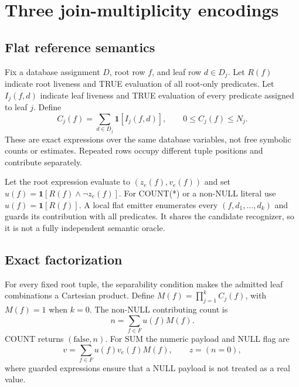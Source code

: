 \documentclass[3p,times,authoryear]{elsarticle}
\newcommand{\ind}[1]{\mathbf{1}[#1]}
\begin{document}
\section{Three join-multiplicity encodings}\label{sec:method}
\subsection{Flat reference semantics}
Fix a database assignment $D$, root row $f$, and leaf row $d\in D_j$. Let $R(f)$ indicate root liveness and TRUE evaluation of all root-only predicates. Let $I_j(f,d)$ indicate leaf liveness and TRUE evaluation of every predicate assigned to leaf $j$. Define
\begin{equation}
 C_j(f)=\sum_{d\in D_j}\ind{I_j(f,d)},\qquad 0\le C_j(f)\le N_j.
 \label{eq:counts}
\end{equation}
These are exact expressions over the same database variables, not free symbolic counts or estimates. Repeated rows occupy different tuple positions and contribute separately.

Let the root expression evaluate to $(z_e(f),v_e(f))$ and set $u(f)=\ind{R(f)\land\neg z_e(f)}$. For COUNT(*) or a non-NULL literal use $u(f)=\ind{R(f)}$. A local flat emitter enumerates every $(f,d_1,\ldots,d_k)$ and guards its contribution with all predicates. It shares the candidate recognizer, so it is not a fully independent semantic oracle.

\subsection{Exact factorization}
For every fixed root tuple, the separability condition makes the admitted leaf combinations a Cartesian product. Define $M(f)=\prod_{j=1}^{k}C_j(f)$, with $M(f)=1$ when $k=0$. The non-NULL contributing count is
\begin{equation}
 n=\sum_{f\in F}u(f)M(f).
 \label{eq:n}
\end{equation}
COUNT returns $(\mathrm{false},n)$. For SUM the numeric payload and NULL flag are
\begin{equation}
 v=\sum_{f\in F}u(f)v_e(f)M(f),\qquad z=(n=0),
 \label{eq:sum}
\end{equation}
where guarded expressions ensure that a NULL payload is not treated as a real value.
\end{document}
